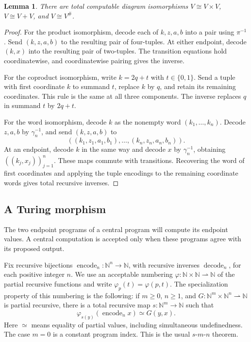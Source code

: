 \documentclass[11pt]{article}
\newtheorem{lemma}[theorem]{Lemma}
\newcommand{\N}{\mathbb N}
\begin{document}
\begin{lemma}\label{lem:fork-frames}
There are total computable diagram isomorphisms
$V\cong V\times V$, $V\cong V+V$, and $V\cong V^\#$.
\end{lemma}
\begin{proof}
For the product isomorphism, decode each of $k,z,a,b$ into a
pair using $\pi^{-1}$. Send $(k,z,a,b)$ to the resulting pair
of four-tuples. At either endpoint, decode $(k,x)$ into the
resulting pair of two-tuples. The transition equations hold
coordinatewise, and coordinatewise pairing gives the inverse.

For the coproduct isomorphism, write $k=2q+t$ with
$t\in\{0,1\}$. Send a tuple with first coordinate $k$ to
summand $t$, replace $k$ by $q$, and retain its remaining
coordinates. This rule is the same at all three components.
The inverse replaces $q$ in summand $t$ by $2q+t$.

For the word isomorphism, decode $k$ as the nonempty word
$(k_1,\ldots,k_n)$. Decode $z,a,b$ by $\gamma_n^{-1}$,
and send $(k,z,a,b)$ to
\[
 ((k_1,z_1,a_1,b_1),\ldots,(k_n,z_n,a_n,b_n)).
\]
At an endpoint, decode $k$ in the same way and decode $x$
by $\gamma_n^{-1}$, obtaining $((k_j,x_j))_{j=1}^n$.
These maps commute with transitions. Recovering the word of
first coordinates and applying the tuple encodings to the
remaining coordinate words gives total recursive inverses.
\end{proof}

\subsection{A Turing morphism}\label{app:fork-turing}

The two endpoint programs of a central program will compute its
endpoint values. A central computation is accepted only when
these programs agree with its proposed output.

Fix recursive bijections
$\operatorname{encode}_n:\N^n\to\N$, with recursive inverses
$\operatorname{decode}_n$, for each positive integer $n$.
We use an acceptable numbering
$\varphi:\N\times\N\rightharpoonup\N$ of the partial recursive
functions and write $\varphi_p(t)=\varphi(p,t)$.
The specialization property of this numbering is the following:
if $m\geq0$, $n\geq1$, and
$G:\N^m\times\N^n\rightharpoonup\N$ is partial recursive,
there is a total recursive map $s:\N^m\to\N$ such that
\[
 \varphi_{s(y)}(\operatorname{encode}_n x)\simeq G(y,x).
\]
Here $\simeq$ means equality of partial values,
including simultaneous undefinedness. The case $m=0$ is a
constant program index. This is the usual $s$-$m$-$n$ theorem.
\end{document}
